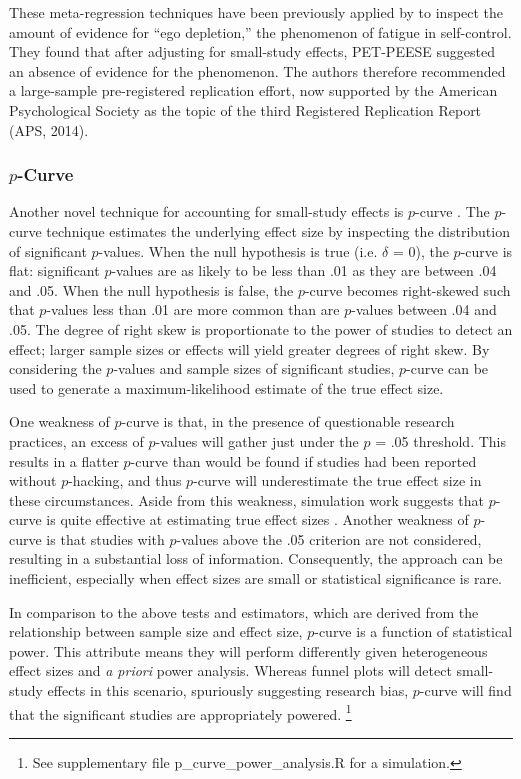 \documentclass[man, mask]{apa6}
\begin{document}
These meta-regression techniques have been previously applied by \citet{Carter:McCullough:2014} to inspect the amount of evidence for ``ego depletion,'' the phenomenon of fatigue in self-control. They found that after adjusting for small-study effects, PET-PEESE suggested an absence of evidence for the phenomenon. The authors therefore recommended a large-sample pre-registered replication effort, now supported by the American Psychological Society as the topic of the third Registered Replication Report (APS, 2014). \nocite{APS:2014}

\subsubsection{$p$-Curve}
Another novel technique for accounting for small-study effects is $p$-curve \citep{Simonsohn:etal:2014,Simonsohn:etal:2014b}. The $p$-curve technique estimates the underlying effect size by inspecting the distribution of significant $p$-values. 
When the null hypothesis is true (i.e. $\delta$ = 0), the $p$-curve is flat: significant $p$-values are as likely to be less than .01 as they are between .04 and .05. When the null hypothesis is false, the $p$-curve becomes right-skewed such that $p$-values less than .01 are more common than are $p$-values between .04 and .05. The degree of right skew is proportionate to the power of studies to detect an effect; larger sample sizes or effects will yield greater degrees of right skew. By considering the $p$-values and sample sizes of significant studies, $p$-curve can be used to generate a maximum-likelihood estimate of the true effect size.

One weakness of $p$-curve is that, in the presence of questionable research practices, an excess of $p$-values will gather just under the $p$ = .05 threshold. This results in a flatter $p$-curve than would be found if studies had been reported without $p$-hacking, and thus $p$-curve will underestimate the true effect size in these circumstances. Aside from this weakness, simulation work suggests that $p$-curve is quite effective at estimating true effect sizes \citep{Simonsohn:etal:2014,Simonsohn:etal:2014b}.  Another weakness of $p$-curve is that studies with $p$-values above the .05 criterion are not considered, resulting in a substantial loss of information.  Consequently, the approach can be inefficient, especially when effect sizes are small or statistical significance is rare.

In comparison to the above tests and estimators, which are derived from the relationship between sample size and effect size, $p$-curve is a function of statistical power. This attribute means they will perform differently given heterogeneous effect sizes and {\em a priori} power analysis. Whereas funnel plots will detect small-study effects in this scenario, spuriously suggesting research bias, $p$-curve will find that the significant studies are appropriately powered. \footnote{See supplementary file p\_curve\_power\_analysis.R for a simulation.}
\end{document}
